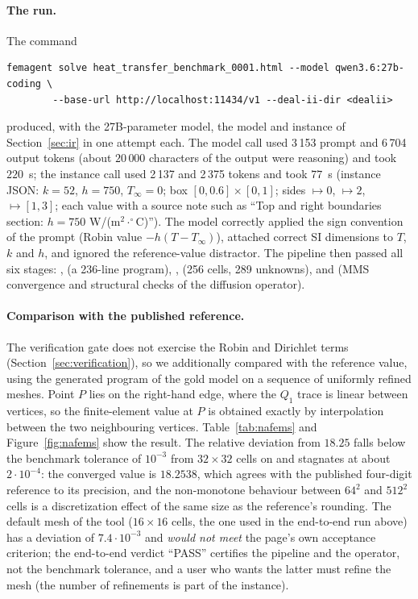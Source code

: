 \paragraph{The run.} The command
\begin{lstlisting}
femagent solve heat_transfer_benchmark_0001.html --model qwen3.6:27b-coding \
        --base-url http://localhost:11434/v1 --deal-ii-dir <dealii>
\end{lstlisting}
produced, with the 27B-parameter model, the model and instance of Section~\ref{sec:ir} in one attempt each. The model call used 3\,153 prompt and 6\,704 output tokens (about $20\,000$ characters of the output were reasoning) and took $220$~s; the instance call used 2\,137 and 2\,375 tokens and took $77$~s (instance JSON: $k=52$, $h=750$, $T_\infty=0$; box $[0,0.6]\times[0,1]$; sides $\mapsto0$, $\mapsto2$, $\mapsto[1,3]$; each value with a source note such as ``Top and right boundaries section: $h=750$ W/(m$^2\cdot^\circ$C)''). The model correctly applied the sign convention of the prompt (Robin value $-h(T-T_\infty)$), attached correct SI dimensions to $T$, $k$ and $h$, and ignored the reference-value distractor. The pipeline then passed all six stages: ,  (a 236-line program), ,  (256 cells, 289 unknowns),  and  (MMS convergence and structural checks of the diffusion operator).

\paragraph{Comparison with the published reference.} The verification gate does not exercise the Robin and Dirichlet terms (Section~\ref{sec:verification}), so we additionally compared with the reference value, using the generated program of the gold model on a sequence of uniformly refined meshes. Point $P$ lies on the right-hand edge, where the $Q_1$ trace is linear between vertices, so the finite-element value at $P$ is obtained exactly by interpolation between the two neighbouring vertices. Table~\ref{tab:nafems} and Figure~\ref{fig:nafems} show the result. The relative deviation from $18.25$ falls below the benchmark tolerance of $10^{-3}$ from $32\times32$ cells on and stagnates at about $2\cdot10^{-4}$: the converged value is $18.2538$, which agrees with the published four-digit reference to its precision, and the non-monotone behaviour between $64^2$ and $512^2$ cells is a discretization effect of the same size as the reference's rounding. The default mesh of the tool ($16\times16$ cells, the one used in the end-to-end run above) has a deviation of $7.4\cdot10^{-3}$ and \emph{would not meet} the page's own acceptance criterion; the end-to-end verdict ``PASS'' certifies the pipeline and the operator, not the benchmark tolerance, and a user who wants the latter must refine the mesh (the number of refinements is part of the instance).

